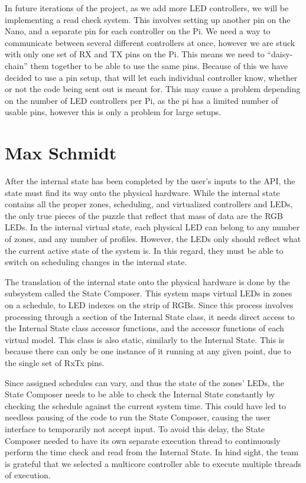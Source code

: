 \documentclass[onecolumn, draftclsnofoot,10pt, compsoc]{IEEEtran}
\begin{document}
	\noindent In future iterations of the project, as we add more LED controllers, we will
	be implementing a read check system. This involves setting up another pin on
	the Nano, and a separate pin for each controller on the Pi. We need a way to
	communicate between several different controllers at once, however we are
	stuck with only one set of RX and TX pins on the Pi. This means we need to
	“daisy-chain” them together to be able to use the same pins. Because of this
	we have decided to use a pin setup, that will let each individual controller
	know, whether or not the code being sent out is meant for. This may cause a
	problem depending on the number of LED controllers per Pi, as the pi has a
	limited number of usable pins, however this is only a problem for large setups.

	\section{Max Schmidt}
	After the internal state has been completed by the user's inputs to the API, the state must find its way onto the physical hardware.
	While the internal state contains all the proper zones, scheduling, and virtualized controllers and LEDs, the only true pieces of
	the puzzle that reflect that mass of data are the RGB LEDs. In the internal virtual state, each physical LED can belong to any number
	of zones, and any number of profiles. However, the LEDs only should reflect what the current active state of the system is. In this
	regard, they must be able to switch on scheduling changes in the internal state.

	\noindent The translation of the internal state onto the physical hardware is done by the subsystem called the State Composer. This
	system maps virtual LEDs in zones on a schedule, to LED indexes on the strip of RGBs. Since this process involves processing through
	a section of the Internal State class, it needs direct access to the Internal State class accessor functions, and the accessor functions
	of each virtual model. This class is also static, similarly to the Internal State.  This is because there can only be one instance of it
	running at any given point, due to the single set of RxTx pins.

	\noindent Since assigned schedules can vary, and thus the state of the zones’ LEDs, the State Composer needs to be able to check the
	Internal State constantly by checking the schedule against the current system time. This could have led to needless pausing of the code
	to run the State Composer, causing the user interface to temporarily not accept input. To avoid this delay, the State Composer needed to
	have its own separate execution thread to continuously perform the time check and read from the Internal State. In hind sight, the team
	is grateful that we selected a multicore controller able to execute multiple threads of execution.
\end{document}
